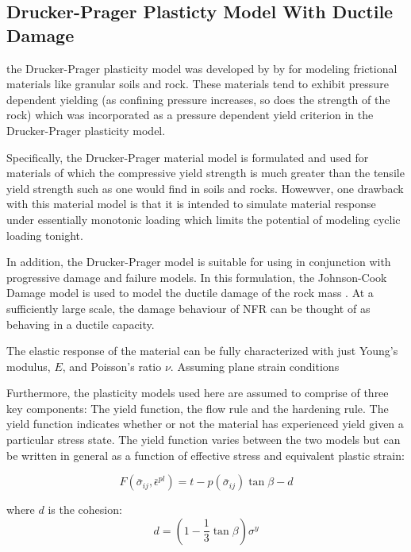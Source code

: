 \subsection{Drucker-Prager Plasticty Model With Ductile Damage}
the Drucker-Prager plasticity model was developed by by \citet{drucker_implications_1950} for modeling frictional materials like granular soils and rock. These materials tend  to exhibit pressure dependent yielding (as confining
pressure increases, so does the strength of the rock) which was incorporated as a pressure dependent yield criterion in the Drucker-Prager plasticity model. 

Specifically, the Drucker-Prager material model is formulated and used for materials of which the compressive yield strength is much greater than the tensile yield strength such as one would find in soils and rocks. Howewver, one drawback with this material model is that it is intended to simulate material response under essentially monotonic loading which limits the potential of modeling cyclic loading tonight.

In addition, the Drucker-Prager model is suitable for using in conjunction with progressive damage and failure models. In this formulation, the Johnson-Cook Damage model is used to model the ductile damage of the rock mass \cite{johnson_fracture_1985}. At a sufficiently large scale, the damage behaviour of NFR can be thought of as behaving in a ductile capacity. 

The elastic response of the material can be fully characterized with just Young's modulus, $E$, and Poisson's ratio $\nu$. Assuming plane strain conditions

Furthermore, the plasticity models used here are assumed to comprise of three key components: The yield function, the flow rule and the hardening rule. The yield function indicates whether or not the material has experienced yield given a particular stress state. The yield function varies between the two models but can be written in general as a function of effective stress and equivalent plastic strain:

\begin{equation}
F\left(\bar{\sigma}_{ij}, \bar{\epsilon}^{pl}\right)=t-p\left(\bar{\sigma}_{ij}\right)\tan\beta -d
\label{eqn:const8c}
\end{equation}

where $d$ is the cohesion:
\begin{equation}
d=\left(1-\frac{1}{3}\tan\beta \right)\sigma^y
\label{eqn:const9}
\end{equation}

